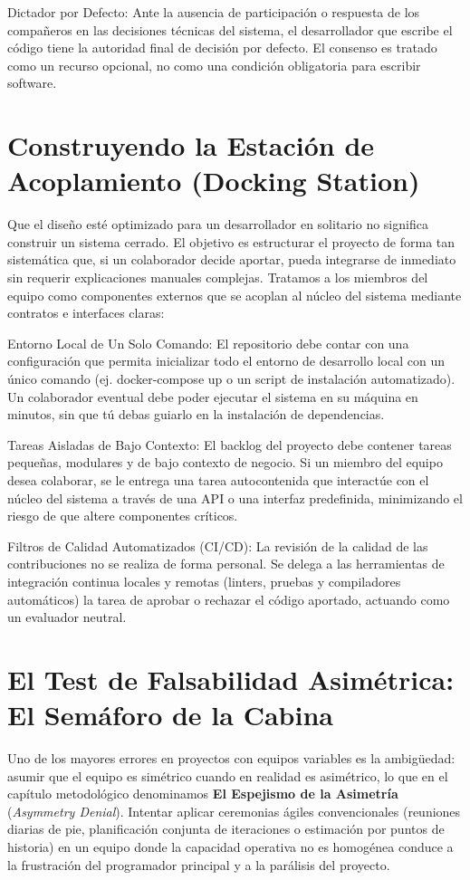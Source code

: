 \documentclass[14pt,a4paper,oneside]{extbook}
\begin{document}
Dictador por Defecto: Ante la ausencia de participación o respuesta de los compañeros en las decisiones técnicas del sistema, el desarrollador que escribe el código tiene la autoridad final de decisión por defecto. El consenso es tratado como un recurso opcional, no como una condición obligatoria para escribir software.

\section{Construyendo la Estación de Acoplamiento (Docking Station)}

Que el diseño esté optimizado para un desarrollador en solitario no significa construir un sistema cerrado. El objetivo es estructurar el proyecto de forma tan sistemática que, si un colaborador decide aportar, pueda integrarse de inmediato sin requerir explicaciones manuales complejas. Tratamos a los miembros del equipo como componentes externos que se acoplan al núcleo del sistema mediante contratos e interfaces claras:

Entorno Local de Un Solo Comando: El repositorio debe contar con una configuración que permita inicializar todo el entorno de desarrollo local con un único comando (ej. docker-compose up o un script de instalación automatizado). Un colaborador eventual debe poder ejecutar el sistema en su máquina en minutos, sin que tú debas guiarlo en la instalación de dependencias.

Tareas Aisladas de Bajo Contexto: El backlog del proyecto debe contener tareas pequeñas, modulares y de bajo contexto de negocio. Si un miembro del equipo desea colaborar, se le entrega una tarea autocontenida que interactúe con el núcleo del sistema a través de una API o una interfaz predefinida, minimizando el riesgo de que altere componentes críticos.

Filtros de Calidad Automatizados (CI/CD): La revisión de la calidad de las contribuciones no se realiza de forma personal. Se delega a las herramientas de integración continua locales y remotas (linters, pruebas y compiladores automáticos) la tarea de aprobar o rechazar el código aportado, actuando como un evaluador neutral.

\section{El Test de Falsabilidad Asimétrica: El Semáforo de la Cabina}

Uno de los mayores errores en proyectos con equipos variables es la ambigüedad: asumir que el equipo es simétrico cuando en realidad es asimétrico, lo que en el capítulo metodológico denominamos \textbf{El Espejismo de la Asimetría} (\textit{Asymmetry Denial}). Intentar aplicar ceremonias ágiles convencionales (reuniones diarias de pie, planificación conjunta de iteraciones o estimación por puntos de historia) en un equipo donde la capacidad operativa no es homogénea conduce a la frustración del programador principal y a la parálisis del proyecto.
\end{document}
